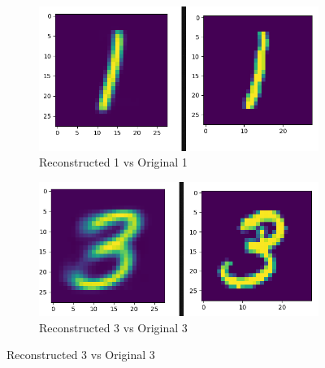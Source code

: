 \documentclass[a4paper,10pt]{article}
\begin{document}
 \begin{figure}[h]
 \begin{subfigure}{.5\textwidth}
 \centering
 \includegraphics[scale=0.4]{Results/SPAMS_X_ALL_K1024/lambdagrand_recons1.png}
  \caption{Reconstructed 1 vs Original 1}
 \end{subfigure}%
  \begin{subfigure}{.3\textwidth}
 \centering
 \includegraphics[scale=0.39]{Results/SPAMS_X_ALL_K1024/lambdagrand_recons3.png}
  \caption{Reconstructed 3 vs Original 3}

 \end{subfigure}%
\end{figure}

\newpage
\end{document}

